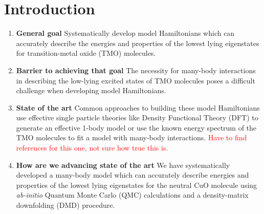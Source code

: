 \documentclass{article}
\begin{document}
\section{Introduction}
\begin{enumerate}
\item \textbf{General goal}
Systematically develop model Hamiltonians which can accurately describe the energies and properties of the lowest lying eigenstates for transition-metal oxide (TMO) molecules.

\item \textbf{Barrier to achieving that goal} The necessity for many-body interactions in describing the low-lying excited states of TMO molecules poses a difficult challenge when developing model Hamiltonians.

\item \textbf{State of the art} Common approaches to building these model Hamiltonians use effective single particle theories like Density Functional Theory (DFT) to generate an effective 1-body model or use the known energy spectrum of the TMO molecules to fit a model with many-body interactions. 
\textcolor{red}{Have to find references for this one, not sure how true this is.}

\item\textbf{How are we advancing state of the art} We have systematically developed a many-body model which can accurately describe energies and properties of the lowest lying eigenstates for the neutral CuO molecule using \textit{ab-initio} Quantum Monte Carlo (QMC) calculations and a density-matrix downfolding (DMD) procedure. 
\end{enumerate}
\end{document}
